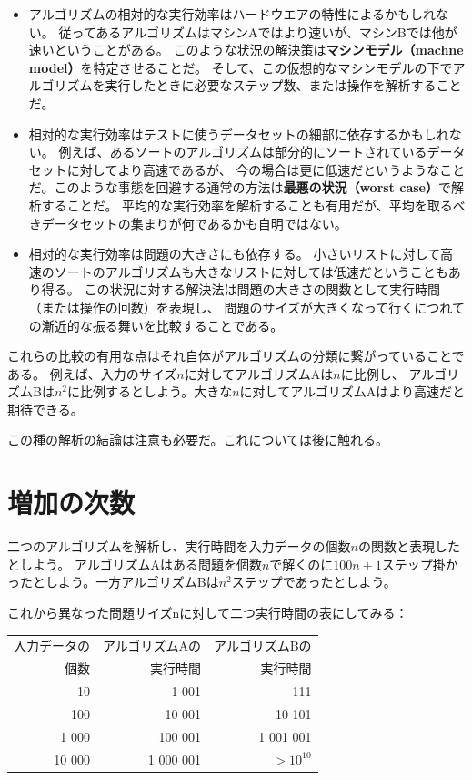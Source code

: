 \documentclass[a4j,12pt,makeidx]{jbook}
\begin{document}
\begin{itemize}
\item アルゴリズムの相対的な実行効率はハードウエアの特性によるかもしれない。
従ってあるアルゴリズムはマシンAではより速いが、マシンBでは他が速いということがある。
このような状況の解決策は{\bf マシンモデル（machne model）}を特定させることだ。
そして、この仮想的なマシンモデルの下でアルゴリズムを実行したときに必要なステップ数、または操作を解析することだ。
\item 相対的な実行効率はテストに使うデータセットの細部に依存するかもしれない。
例えば、あるソートのアルゴリズムは部分的にソートされているデータセットに対してより高速であるが、
今の場合は更に低速だというようなことだ。このような事態を回避する通常の方法は{\bf 最悪の状況（worst case）}で解析することだ。
平均的な実行効率を解析することも有用だが、平均を取るべきデータセットの集まりが何であるかも自明ではない。
\item 相対的な実行効率は問題の大きさにも依存する。
小さいリストに対して高速のソートのアルゴリズムも大きなリストに対しては低速だということもあり得る。
この状況に対する解決法は問題の大きさの関数として実行時間（または操作の回数）を表現し、
問題のサイズが大きくなって行くにつれての漸近的な振る舞いを比較することである。
\end{itemize}
これらの比較の有用な点はそれ自体がアルゴリズムの分類に繋がっていることである。
例えば、入力のサイズ$n$に対してアルゴリズムAは$n$に比例し、
アルゴリズムBは{\tt $n^2$}に比例するとしよう。大きな$n$に対してアルゴリズムAはより高速だと期待できる。\par
この種の解析の結論は注意も必要だ。これについては後に触れる。
%
\section{増加の次数}
二つのアルゴリズムを解析し、実行時間を入力データの個数$n$の関数と表現したとしよう。
アルゴリズムAはある問題を個数$n$で解くのに$100n+1$ステップ掛かったとしよう。一方アルゴリズムBは$n^2$ステップであったとしよう。\par
これから異なった問題サイズnに対して二つ実行時間の表にしてみる： \\

\begin{tabular}{|r|r|r|}
\hline
 入力データの  &  	アルゴリズムAの & アルゴリズムBの \\
 個数  &   実行時間  & 実行時間 \\
\hline
10        &   1 001           & 111         \\
100       &   10 001          & 10 101         \\
1 000     &   100 001         & 1 001 001         \\
10 000    &   1 000 001       & $> 10^{10}$         \\
\hline
\end{tabular} \\
 
\end{document}
